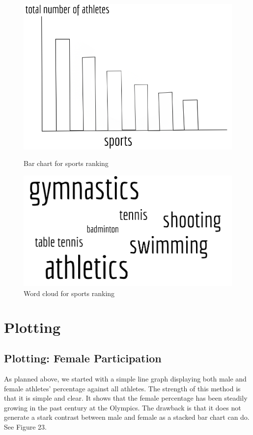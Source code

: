 \documentclass[12pt]{article}
\begin{document}
\begin{figure}[!t]
  \begin{minipage}[b]{0.45\textwidth}
  \centering
    \includegraphics[scale=0.3]{pics/7.png}
    \caption{\small Bar chart for sports ranking}
    \label{fig:1}
  \end{minipage}
  \hfill
  \begin{minipage}[b]{0.45\textwidth}
  \centering
    \includegraphics[scale=0.3]{pics/8.png}
    \caption{\small Word cloud for sports ranking}
    \label{fig:2}
  \end{minipage}
\end{figure}

\section{Plotting}
\subsection{Plotting: Female Participation}
As planned above, we started with a simple line graph displaying both male and female athletes’ percentage against all athletes. The strength of this method is that it is simple and clear. It shows that the female percentage has been steadily growing in the past century at the Olympics. The drawback is that it does not generate a stark contrast between male and female as a stacked bar chart can do. See Figure 23. 
\end{document}
